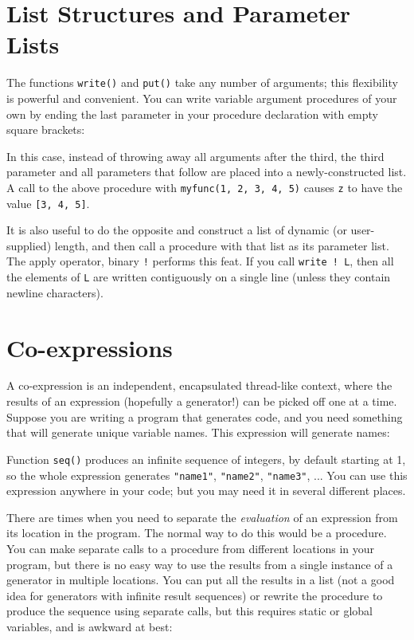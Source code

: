 \section{List Structures and Parameter Lists}

The functions \texttt{write()} and \texttt{put()} take any number of
arguments; this flexibility is powerful and convenient.
You can write variable argument
procedures of your own by ending the last parameter in your procedure
declaration with empty square brackets:


\noindent
In this case, instead of throwing away all arguments after the third,
the third parameter and all parameters that follow are placed into a
newly-constructed list. A call to the above procedure with
\texttt{myfunc(1, 2, 3, 4, 5)} causes \texttt{z} to have the value
\texttt{[3, 4, 5]}.

It is also useful to do the opposite and construct a list
of dynamic (or user-supplied) length, and then call a
procedure with that list as its parameter list. The
apply operator, binary
\texttt{!} performs this feat. If you call \texttt{write ! L}, then all
the elements of \texttt{L} are written contiguously on a single line
(unless they contain newline characters).

\section{Co-expressions}

A co-expression is an independent, encapsulated
thread{}-like context, where the results of an expression
(hopefully a generator!) can be picked off one at a time.
Suppose you are writing a program that generates
code, and you need something that will generate unique variable names.
This expression will generate names:


\noindent
Function \texttt{seq()} produces an infinite sequence
of integers, by default starting at 1, so the whole expression
generates \texttt{"name1"},
\texttt{"name2"},
\texttt{"name3"}, ... You can
use this expression anywhere in your code; but you may need
it in several different places.

There are times when you need to separate the {\em evaluation\/} of an
expression from its location in the program. The normal
way to do this would be a procedure. You can make separate calls
to a procedure from different locations in your program, but there is
no easy way to use the results from a single instance
of a generator in multiple locations. You can put all the results in a
list (not a good idea for generators with infinite result sequences) or
rewrite the procedure to produce the sequence using separate calls, but
this requires static or global variables, and is awkward at best:

